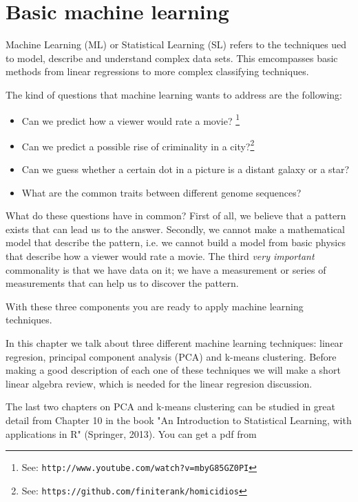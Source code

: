 \documentclass{article}
\begin{document}
\setcounter{section}{4}
\section{Basic machine learning}


Machine Learning (ML) or Statistical Learning (SL) refers to the
techniques ued to model, describe and understand complex data
sets. This emcompasses basic methods from linear regressions to more
complex classifying techniques.

The kind of questions that machine learning wants to address are the
following:

\begin{itemize}
\item{Can we predict how a viewer would rate a movie? \footnote{See: \texttt{http://www.youtube.com/watch?v=mbyG85GZ0PI}}}
\item{Can we predict a possible rise of criminality in a
  city?\footnote{See: \texttt{https://github.com/finiterank/homicidios}}}
\item{Can we guess whether a certain dot in a picture is a distant
  galaxy or a star?}
\item{What are the common traits between different genome sequences?}
\end{itemize}

What do these questions have in common? First of all, we believe that
a pattern exists that can lead us to the answer. Secondly, we cannot
make a mathematical model that describe the pattern, i.e. we cannot
build a model from basic physics that describe how a viewer would rate
a movie. The third \emph{very important} commonality is that we have
data on it; we have a measurement or series of measurements that can
help us to discover the pattern.

With these three components you are ready to apply machine learning
techniques. 


In this chapter we talk about three different machine learning
techniques: linear regresion, principal component analysis (PCA) and k-means
clustering. Before making a good description of each one of these
techniques we will make a short linear algebra review, which is needed
for the linear regresion discussion.

The last two chapters on PCA and k-means clustering can be studied in
great detail from Chapter 10 in the book "An Introduction to
Statistical Learning, with applications in R"  (Springer, 2013). You
can get a pdf from 
\end{document}
